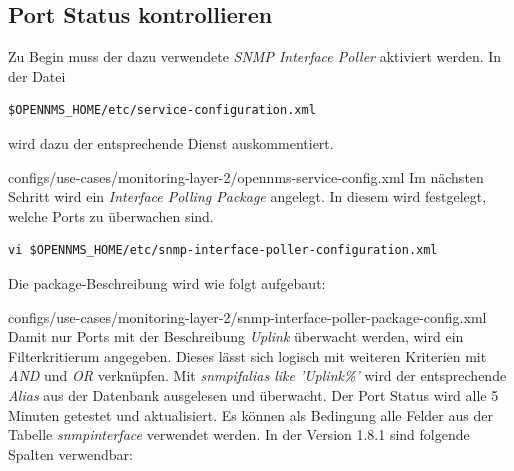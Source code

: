 \subsection{Port Status kontrollieren}
Zu Begin muss der dazu verwendete \textit{SNMP Interface Poller} aktiviert werden. In der Datei
\begin{lstlisting}[numbers=none]
$OPENNMS_HOME/etc/service-configuration.xml
\end{lstlisting}
wird dazu der entsprechende Dienst auskommentiert.

  {configs/use-cases/monitoring-layer-2/opennms-service-config.xml}
Im nächsten Schritt wird ein \emph{Interface Polling Package} angelegt. In diesem wird festgelegt, welche Ports zu überwachen sind.
\begin{lstlisting}[numbers=none]
vi $OPENNMS_HOME/etc/snmp-interface-poller-configuration.xml
\end{lstlisting}
Die package-Beschreibung wird wie folgt aufgebaut:

  {configs/use-cases/monitoring-layer-2/snmp-interface-poller-package-config.xml}
Damit nur Ports mit der Beschreibung \textit{Uplink} überwacht werden, wird ein Filterkritierum angegeben. Dieses lässt sich logisch mit weiteren Kriterien mit \textit{AND} und \textit{OR} verknüpfen. Mit \textit{snmpifalias like 'Uplink\%'} wird der entsprechende \textit{Alias} aus der Datenbank ausgelesen und überwacht. Der Port Status wird alle 5 Minuten getestet und aktualisiert. Es können als Bedingung alle Felder aus der Tabelle \textit{snmpinterface} verwendet werden. In der Version 1.8.1 sind folgende Spalten verwendbar:

\pagebreak

